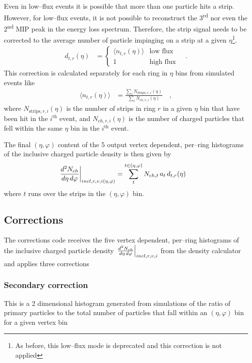 \documentclass[11pt]{article}
\newcommand{\dndetadphi}[1][]{{\ensuremath%
    \ifx|#1|\else\left.\fi%
    \frac{d^2N_{ch}}{d\eta\,d\varphi}%
    \ifx|#1|\else\right|_{#1}\fi%
}}
\begin{document}
Even in low--flux events it is possible that more than one particle
hits a strip.  However, for low--flux events, it is not possible to
reconstruct the 3\textsuperscript{rd} nor even the
2\textsuperscript{nd} MIP peak in the energy loss spectrum.
Therefore, the strip signal needs to be corrected to the average
number of particle impinging on a strip at a given $\eta$\footnote{As
  before, this low--flux mode is deprecated and this correction is not
  applied}.  
\begin{align}
  d_{t,r}(\eta) &= \left\{
    \begin{array}{cl} \langle
      n_{t,r}(\eta)\rangle & \text{low flux}\\
      1 & \text{high flux}
    \end{array}\right.\quad.
\end{align}
This correction is calculated separately for each ring in $\eta$ bins
from simulated events like
\begin{align}
  \label{eq:double_hit_corr} 
  \langle n_{t,r}(\eta)\rangle &= \frac{
    \sum_i N_{\text{strips},r,i}(\eta)}{
    \sum_i N_{ch,r,i}(\eta)}\quad,
\end{align}
where $N_{\text{strips},r,i}(\eta)$ is the number of strips in ring
$r$ in a given $\eta$ bin that have been hit in the $i^{\text{th}}$
event, and $N_{ch,r,i}(\eta)$ is the number of charged particles that
fell within the same $\eta$ bin in the $i^{\text{th}}$ event.

The final $(\eta,\varphi)$ content of the 5 output vertex dependent,
per--ring histograms of the inclusive charged particle density is then
given by
\begin{align}
  \label{eq:density}
  \dndetadphi[incl,r,v,i(\eta,\varphi)] &= \sum_t^{t\in(\eta,\varphi)}
  N_{ch,t}\,a_t\,d_{t,r}(\eta)
\end{align}
where $t$ runs over the strips in the $(\eta,\varphi)$ bin. 

\subsection{Corrections}

The corrections code receives the five vertex dependent,
per--ring histograms of the inclusive charged particle density
$\dndetadphi[incl,r,v,i]$ from the density calculator and applies
three corrections 

\subsubsection{Secondary correction}
  This is a 2 dimensional histogram generated from simulations of the
  ratio of primary particles to the total number of particles that
  fall within an $(\eta,\varphi)$ bin for a given vertex bin
\end{document}
